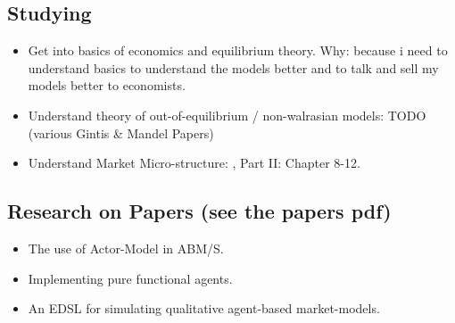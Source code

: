 \documentclass{article}
\begin{document}
\subsection{Studying}
\begin{itemize}
\item Get into basics of economics and equilibrium theory. Why: because i need to understand basics to understand the models better and to talk and sell my models better to economists.
\item Understand theory of out-of-equilibrium / non-walrasian models: TODO (various Gintis \& Mandel Papers)
\item Understand Market Micro-structure: \cite{LehalleLaruelle2013}, \cite{baker_market_2013} Part II: Chapter 8-12.
\end{itemize}

\subsection{Research on Papers (see the papers pdf)}
\begin{itemize}
\item The use of Actor-Model in ABM/S.
\item Implementing pure functional agents.
\item An EDSL for simulating qualitative agent-based market-models.
\end{itemize}





\end{document}
